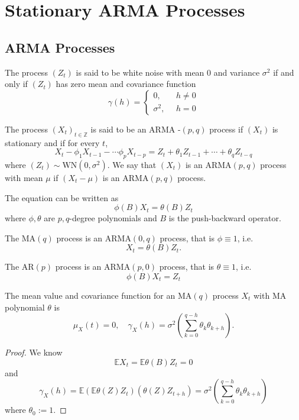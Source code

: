 \section{Stationary ARMA Processes}

\subsection{ARMA Processes}

\begin{definition}
     The process $(Z_t)$ is said to be white noise with mean $0$ and
variance $\sigma^2$ if and only if $(Z_t)$ has zero mean and covariance function
\[
\gamma(h) = \begin{cases}
    0,\quad &h \neq 0 \\ \sigma^2, & h = 0 
\end{cases}
\]
\end{definition}

\begin{definition}
     The process  $(X_t)_{t\in\mathbb{Z}}$ is said to be an ARMA -$(p,q)$ process if $(X_t)$ is stationary and if for every $t$,
    \[
    X_t - \phi_1 X_{t-1} - \cdots \phi_p X_{t-p} = Z_t + \theta_1 Z_{t-1} + \cdots + \theta_q Z_{t-q}
    \]
where $(Z_t) \sim \text{WN}(0,\sigma^2)$. We say that $(X_t)$ is an ARMA$(p,q)$ process with mean $\mu$ if $(X_t - \mu)$ is an ARMA$(p,q)$ process.\par
The equation can be written as 
\[
\phi(B)X_t = \theta(B)Z_t
\]
where $\phi,\theta$ are $p,q$-degree polynomials and $B$ is the push-backward operator.
\end{definition}

\begin{definition}
    The MA$(q)$ process is an ARMA$(0,q)$ process, that is $\phi \equiv 1$, i.e.
    \[
    X_t = \theta(B)Z_t.
    \]\par
    The AR$(p)$ process is an ARMA$(p,0)$ process, that is $\theta \equiv 1$, i.e.
    \[
    \phi(B)X_t = Z_t
    \]
\end{definition}

\begin{proposition}
    The mean value and covariance function for an MA$(q)$ process $X_t$ with MA polynomial $\theta$ is
    \[
    \mu_X(t) = 0,\quad \gamma_X(h) = \sigma^2\left(\sum\limits_{k=0}^{q-h}\theta_k\theta_{k+h}\right).
    \]
\end{proposition}
\begin{proof}
    We know
    \[
    \mathbb{E} X_t = \mathbb{E}\theta(B)Z_t = 0
    \]
    and
    \[
    \gamma_X(h) = \mathbb{E}\left(\mathbb{E}\theta(Z)Z_t\right)\left(\theta(Z)Z_{t+h}\right) = \sigma^2\left(\sum\limits_{k=0}^{q-h}\theta_k\theta_{k+h}\right)
    \]
    where $\theta_0:=1$.
\end{proof}

